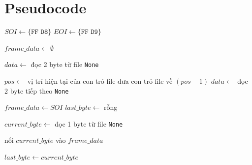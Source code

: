 \section{Pseudocode}

\begin{algorithm}[H]
\caption{}
\begin{algorithmic}[1]
    \State $SOI \gets \texttt{\{FF D8\}}$
    \State $EOI \gets \texttt{\{FF D9\}}$

    \State $frame\_data \gets \emptyset$

    \State $data \gets$ đọc 2 byte từ file
        \State \Return \texttt{None}
    \EndIf

        \State $pos \gets$ vị trí hiện tại của con trỏ file
        \State đưa con trỏ file về $(pos - 1)$
        \State $data \gets$ đọc 2 byte tiếp theo
            \State \Return \texttt{None}
        \EndIf
    \EndWhile

    \State $frame\_data \gets SOI$
    \State $last\_byte \gets$ rỗng

        \State $current\_byte \gets$ đọc 1 byte từ file
            \State \Return \texttt{None}
        \EndIf

        \State nối $current\_byte$ vào $frame\_data$


        \State $last\_byte \gets current\_byte$
    \EndWhile
\EndProcedure
\end{algorithmic}
\end{algorithm}